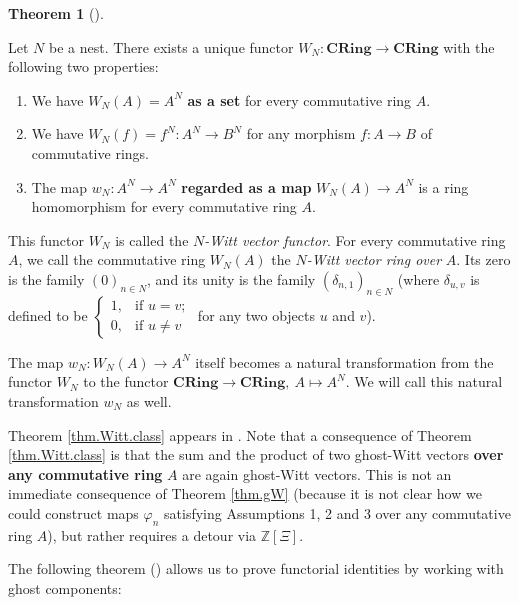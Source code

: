 \documentclass[numbers=enddot,12pt,final,onecolumn,notitlepage]{scrartcl}%
\theoremstyle{definition}
\newtheorem{theo}{Theorem}[section]
\newenvironment{theorem}[1][]
{\begin{theo}[#1]\begin{leftbar}}
{\end{leftbar}\end{theo}}
\begin{document}
\begin{theorem}
\label{thm.Witt.class}Let $N$ be a nest. There exists a unique functor
$W_{N}:\mathbf{CRing}\rightarrow\mathbf{CRing}$ with the following two properties:

\begin{enumerate}
\item We have $W_{N}\left(  A\right)  =A^{N}$ \textbf{as a set} for every
commutative ring $A$.

\item We have $W_{N}\left(  f\right)  =f^{N}:A^{N}\rightarrow B^{N}$ for any
morphism $f:A\rightarrow B$ of commutative rings.

\item The map $w_{N}:A^{N}\rightarrow A^{N}$ \textbf{regarded as a map }%
$W_{N}\left(  A\right)  \rightarrow A^{N}$ is a ring homomorphism for every
commutative ring $A$.
\end{enumerate}

This functor $W_{N}$ is called the $N$\textit{-Witt vector functor}. For every
commutative ring $A$, we call the commutative ring $W_{N}\left(  A\right)  $
the $N$\textit{-Witt vector ring over }$A$. Its zero is the family $\left(
0\right)  _{n\in N}$, and its unity is the family $\left(  \delta
_{n,1}\right)  _{n\in N}$ (where $\delta_{u,v}$ is defined to be $%
\begin{cases}
1, & \text{if }u=v;\\
0, & \text{if }u\neq v
\end{cases}
$ for any two objects $u$ and $v$).

The map $w_{N}:W_{N}\left(  A\right)  \rightarrow A^{N}$ itself becomes a
natural transformation from the functor $W_{N}$ to the functor $\mathbf{CRing}%
\rightarrow\mathbf{CRing},\ A\mapsto A^{N}$. We will call this natural
transformation $w_{N}$ as well.
\end{theorem}

Theorem \ref{thm.Witt.class} appears in \cite[Theorem 2.6]{rabinoff-witt}.
Note that a consequence of Theorem \ref{thm.Witt.class} is that the sum and
the product of two ghost-Witt vectors \textbf{over any commutative ring }$A$
are again ghost-Witt vectors. This is not an immediate consequence of Theorem
\ref{thm.gW} (because it is not clear how we could construct maps $\varphi
_{n}$ satisfying Assumptions 1, 2 and 3 over any commutative ring $A$), but
rather requires a detour via $\mathbb{Z}\left[  \Xi\right]  $.

The following theorem (\cite[Remark 2.9, part 3]{rabinoff-witt}) allows us to
prove functorial identities by working with ghost components:
\end{document}
